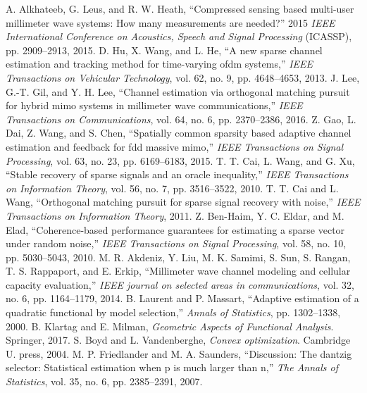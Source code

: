 \documentclass[journal]{IEEEtran}
\begin{document}
\begin{thebibliography}{30}
A. Alkhateeb, G. Leus, and R. W. Heath, “Compressed sensing based multi-user millimeter wave systems: How many measurements are needed?” 2015 \textit {IEEE International Conference on Acoustics, Speech and Signal Processing} (ICASSP), pp. 2909–2913, 2015.
D. Hu, X. Wang, and L. He, “A new sparse channel estimation and tracking method for time-varying ofdm systems,” \textit {IEEE Transactions on Vehicular Technology}, vol. 62, no. 9, pp. 4648–4653, 2013.
J. Lee, G.-T. Gil, and Y. H. Lee, “Channel estimation via orthogonal matching pursuit for hybrid mimo systems in millimeter wave communications,” \textit {IEEE Transactions on Communications}, vol. 64, no. 6, pp. 2370–2386, 2016.
Z. Gao, L. Dai, Z. Wang, and S. Chen, “Spatially common sparsity based adaptive channel estimation and feedback for fdd massive mimo,” \textit {IEEE Transactions on Signal Processing}, vol. 63, no. 23, pp. 6169–6183, 2015.
T. T. Cai, L. Wang, and G. Xu, “Stable recovery of sparse signals and an oracle inequality,” \textit {IEEE Transactions on Information Theory}, vol. 56, no. 7, pp. 3516–3522, 2010.
T. T. Cai and L. Wang, “Orthogonal matching pursuit for sparse signal recovery with noise,” \textit {IEEE Transactions on Information Theory}, 2011.
Z. Ben-Haim, Y. C. Eldar, and M. Elad, “Coherence-based performance guarantees for estimating a sparse vector under random noise,” \textit {IEEE Transactions on Signal Processing}, vol. 58, no. 10, pp. 5030–5043, 2010.
M. R. Akdeniz, Y. Liu, M. K. Samimi, S. Sun, S. Rangan, T. S. Rappaport, and E. Erkip, “Millimeter wave channel modeling and cellular capacity evaluation,” \textit {IEEE journal on selected areas in communications}, vol. 32, no. 6, pp. 1164–1179, 2014.
B. Laurent and P. Massart, “Adaptive estimation of a quadratic functional by model selection,” \textit {Annals of Statistics}, pp. 1302–1338, 2000.
B. Klartag and E. Milman, \textit {Geometric Aspects of Functional Analysis}. Springer, 2017.
S. Boyd and L. Vandenberghe, \textit {Convex optimization}. Cambridge U. press, 2004.
M. P. Friedlander and M. A. Saunders, “Discussion: The dantzig selector: Statistical estimation when p is much larger than n,” \textit {The Annals of Statistics}, vol. 35, no. 6, pp. 2385–2391, 2007.

\end{thebibliography}
\end{document}
